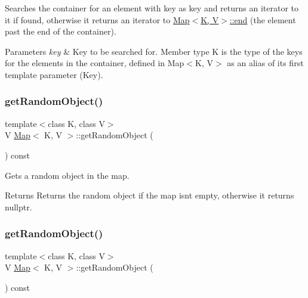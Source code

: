 Searches the container for an element with \textquotesingle{}key\textquotesingle{} as key and returns an iterator to it if found, otherwise it returns an iterator to \hyperlink{classMap_af7192ef1dd6fb558c06442c00a4c516e}{Map$<$\+K, V$>$\+::end} (the element past the end of the container).


\begin{DoxyParams}{Parameters}
{\em key} & Key to be searched for. Member type \textquotesingle{}K\textquotesingle{} is the type of the keys for the elements in the container, defined in Map$<$\+K, V$>$ as an alias of its first template parameter (Key). \\
\hline
\end{DoxyParams}
\mbox{\label{classMap_a99b9731b7ca8fde6c87b3d9307039e9b}} 
\subsubsection{\texorpdfstring{get\+Random\+Object()}{getRandomObject()}\hspace{0.1cm}{\footnotesize\ttfamily [1/2]}}
{\footnotesize\ttfamily template$<$class K, class V$>$ \\
V \hyperlink{classMap}{Map}$<$ K, V $>$\+::get\+Random\+Object (\begin{DoxyParamCaption}{ }\end{DoxyParamCaption}) const\hspace{0.3cm}{\ttfamily [inline]}}

Gets a random object in the map. \begin{DoxyReturn}{Returns}
Returns the random object if the map isn\textquotesingle{}t empty, otherwise it returns nullptr. 
\end{DoxyReturn}
\mbox{\label{classMap_a99b9731b7ca8fde6c87b3d9307039e9b}} 
\subsubsection{\texorpdfstring{get\+Random\+Object()}{getRandomObject()}\hspace{0.1cm}{\footnotesize\ttfamily [2/2]}}
{\footnotesize\ttfamily template$<$class K, class V$>$ \\
V \hyperlink{classMap}{Map}$<$ K, V $>$\+::get\+Random\+Object (\begin{DoxyParamCaption}{ }\end{DoxyParamCaption}) const\hspace{0.3cm}{\ttfamily [inline]}}


